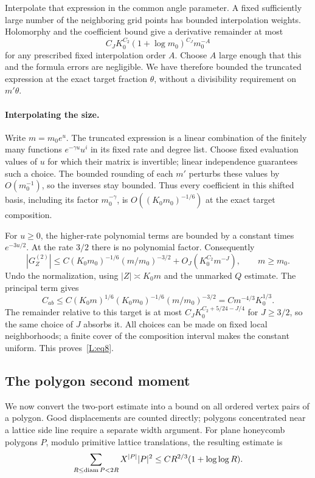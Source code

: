 \documentclass[11pt]{article}
\numberwithin{equation}{section}
\theoremstyle{definition}\newtheorem{definition}[theorem]{Definition}
\theoremstyle{remark}\newtheorem{remark}[theorem]{Remark}
\begin{document}
Interpolate that expression in the common angle parameter. A fixed
sufficiently large number of the neighboring grid points has bounded
interpolation weights. Holomorphy and the coefficient bound give a
derivative remainder at most
\[
 C_JK_0^{C_2}(1+\log m_0)^{C_J}m_0^{-A}
\]
for any prescribed fixed interpolation order $A$. Choose $A$ large
enough that this and the formula errors are negligible. We have therefore
bounded the truncated expression at the exact target fraction $\theta$,
without a divisibility requirement on $m'\theta$.

\paragraph{Interpolating the size.}
Write $m=m_0e^u$. The truncated expression is a linear combination of
the finitely many functions $e^{-\gamma u}u^i$ in its fixed rate and
degree list. Choose fixed evaluation values of $u$ for which their
matrix is invertible; linear independence guarantees such a choice.
The bounded rounding of each $m'$ perturbs these values by $O(m_0^{-1})$,
so the inverses stay bounded. Thus every coefficient in this shifted
basis, including its factor $m_0^{-\gamma}$, is
$O((K_0m_0)^{-1/6})$ at the exact target composition.

For $u\ge0$, the higher-rate polynomial terms are bounded by a constant
times $e^{-3u/2}$. At the rate $3/2$ there is no polynomial factor.
Consequently
\[
 |G_Z^{(2)}|\le C(K_0m_0)^{-1/6}(m/m_0)^{-3/2}
                       +O_J(K_0^{C_2}m^{-J}),\qquad m\ge m_0.
\]
Undo the normalization, using $|Z|\asymp K_0m$ and the unmarked
$Q$ estimate. The principal term gives
\[
 C_{ab}\le C(K_0m)^{1/6}(K_0m_0)^{-1/6}(m/m_0)^{-3/2}
       =C m^{-4/3}K_0^{1/3}.
\]
The remainder relative to this target is at most
$C_JK_0^{C_2+5/24-J/4}$ for $J\ge3/2$, so the same choice of $J$
absorbs it. All choices can be made on fixed local neighborhoods;
a finite cover of the composition interval makes the constant uniform.
This proves~\eqref{L:eq8}.

\subsection{The polygon second moment}

We now convert the two-port estimate into a bound on all ordered vertex
pairs of a polygon. Good displacements are counted directly; polygons
concentrated near a lattice side line require a separate width argument.
For plane honeycomb polygons \(P\), modulo primitive lattice translations,
the resulting estimate is
\begin{equation}
 \sum_{R\le{\rm diam}\,P<2R} X^{|P|}|P|^2\le C R^{2/3}(1+\log\log R).\label{L:eq10}
\end{equation}
\end{document}
